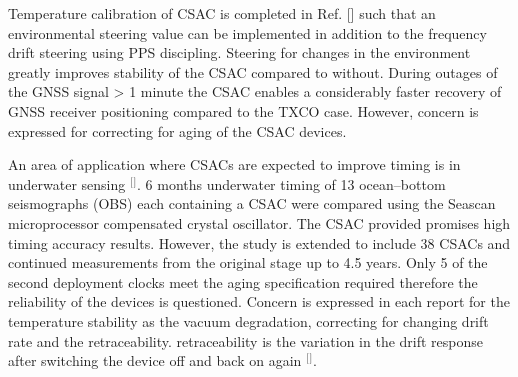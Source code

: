 Temperature calibration of CSAC is completed in Ref. [] such that an environmental steering value can be implemented in addition to the frequency drift steering using PPS discipling. Steering for changes in the environment greatly improves stability of the CSAC compared to without. During outages of the GNSS signal > 1 minute the CSAC enables a considerably faster recovery of GNSS receiver positioning compared to the TXCO case. However, concern is expressed for correcting for aging of the CSAC devices. 

An area of application where CSACs are expected to improve timing is in underwater sensing $^[$\citep{Gardner2012AdvancementsOscillators}$^]$. 6 months underwater timing of 13 ocean–bottom seismographs (OBS) each containing a CSAC were compared using the Seascan microprocessor compensated crystal oscillator. The CSAC provided promises high timing accuracy results. However, the study is extended to include 38 CSACs and continued measurements from the original stage up to 4.5 years. Only 5 of the second deployment clocks meet the aging specification required therefore the reliability of the devices is questioned. Concern is expressed in each report for the temperature stability as the vacuum degradation, correcting for changing drift rate and the retraceability. retraceability is the variation in the drift response after switching the device off and back on again $^[$\citep{Gardner2016ATiming}$^]$.   









































